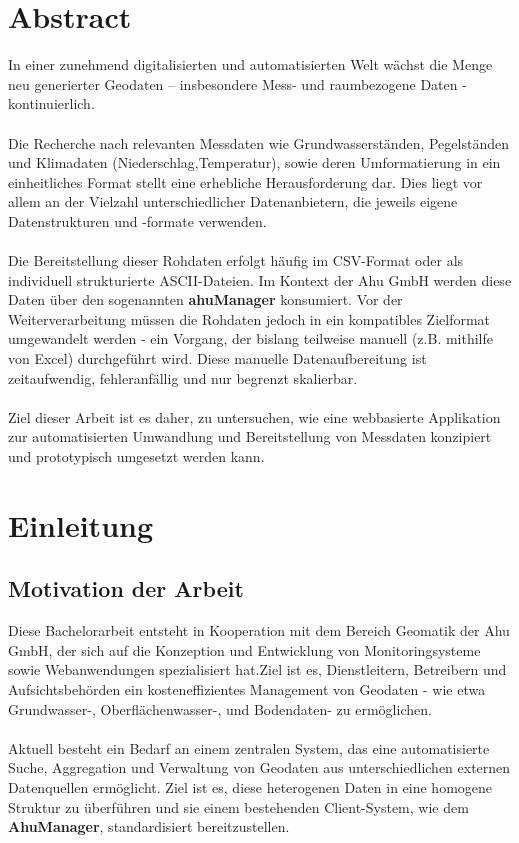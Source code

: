 \documentclass[a4paper,12pt]{scrreprt}
\begin{document}
	\cleardoublepage
	\chapter*{Abstract}
	\thispagestyle{plain}
	In einer zunehmend digitalisierten und automatisierten Welt wächst die Menge neu generierter Geodaten – insbesondere Mess- und raumbezogene Daten - kontinuierlich.\\ \\
	Die Recherche nach relevanten Messdaten wie Grundwasserständen, Pegelständen und Klimadaten (Niederschlag,Temperatur), sowie deren Umformatierung in ein einheitliches Format stellt eine erhebliche Herausforderung dar. Dies liegt vor allem an der Vielzahl unterschiedlicher Datenanbietern, die jeweils eigene Datenstrukturen und -formate verwenden.\\ \\
	Die Bereitstellung dieser Rohdaten erfolgt häufig im CSV-Format oder als individuell strukturierte ASCII-Dateien. Im Kontext der Ahu GmbH werden diese Daten über den sogenannten \textbf{ahuManager} konsumiert. Vor der Weiterverarbeitung müssen die Rohdaten jedoch in ein kompatibles Zielformat umgewandelt werden - ein Vorgang, der bislang teilweise manuell (z.B. mithilfe von Excel) durchgeführt wird. Diese manuelle Datenaufbereitung ist zeitaufwendig, fehleranfällig und nur begrenzt skalierbar. \\ \\
	Ziel dieser Arbeit ist es daher, zu untersuchen, wie eine webbasierte Applikation zur automatisierten Umwandlung und Bereitstellung von Messdaten konzipiert und prototypisch umgesetzt werden kann.
	\clearpage
	\chapter{Einleitung}
	\section{Motivation der Arbeit}
	Diese Bachelorarbeit entsteht in Kooperation mit dem Bereich Geomatik der Ahu GmbH, der sich auf die Konzeption und Entwicklung von Monitoringsysteme sowie Webanwendungen spezialisiert hat.Ziel ist es, Dienstleitern, Betreibern und Aufsichtsbehörden ein kosteneffizientes Management von Geodaten - wie etwa Grundwasser-, Oberflächenwasser-, und Bodendaten- zu ermöglichen. \\\\
	Aktuell besteht ein Bedarf an einem zentralen System, das eine automatisierte Suche, Aggregation und Verwaltung von Geodaten aus unterschiedlichen externen Datenquellen ermöglicht. Ziel ist es, diese heterogenen Daten in eine homogene Struktur zu überführen und sie einem bestehenden Client-System, wie dem \textbf{AhuManager}, standardisiert bereitzustellen.
	
\end{document}
